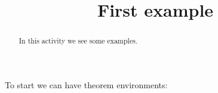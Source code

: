 \documentclass{ximera}
\title{First example}
\begin{document}
	\begin{abstract}
		In this activity we see some examples.
	\end{abstract}
	\maketitle
	
	To start we can have theorem environments:

	
	
	
\end{document}
